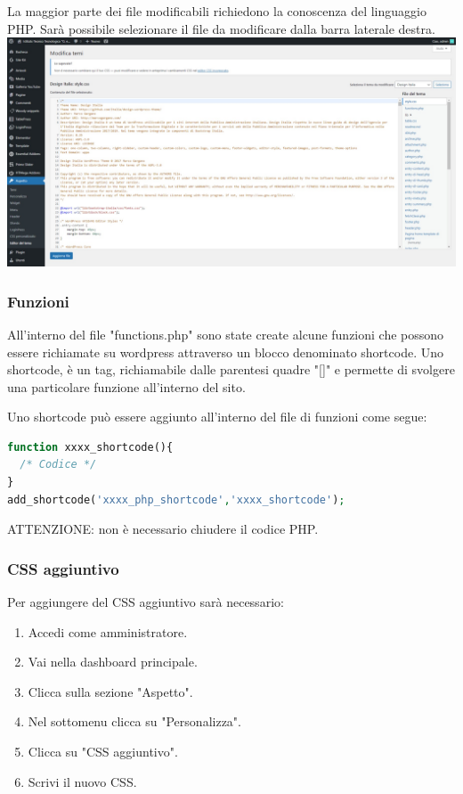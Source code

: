 \documentclass{article}
\begin{document}
	La maggior parte dei file modificabili richiedono la conoscenza del linguaggio PHP.	Sarà possibile selezionare il file da modificare dalla barra laterale destra.\\
	\includegraphics[scale=0.19]{Editor del tema.jpeg}

	\subsubsection{\textbf{Funzioni}}
	All'interno del file "functions.php" sono state create alcune funzioni che possono essere richiamate su wordpress attraverso un blocco denominato shortcode.
	Uno shortcode, è un tag, richiamabile dalle parentesi quadre "[]" e permette di svolgere una particolare funzione all'interno del sito.

	Uno shortcode può essere aggiunto all'interno del file di funzioni come segue:
	\begin{flushleft}
		\begin{lstlisting}[language=php]
function xxxx_shortcode(){
  /* Codice */
}
add_shortcode('xxxx_php_shortcode','xxxx_shortcode');
		\end{lstlisting}
	\end{flushleft}

	ATTENZIONE: non è necessario chiudere il codice PHP.

	\subsubsection{\textbf{CSS aggiuntivo}}
	Per aggiungere del CSS aggiuntivo sarà necessario: 
	\begin{enumerate}
		\item Accedi come amministratore.
		\item Vai nella dashboard principale.
		\item Clicca sulla sezione "Aspetto".
		\item Nel sottomenu clicca su "Personalizza".
		\item Clicca su "CSS aggiuntivo".
		\item Scrivi il nuovo CSS.
	\end{enumerate}
\end{document}
